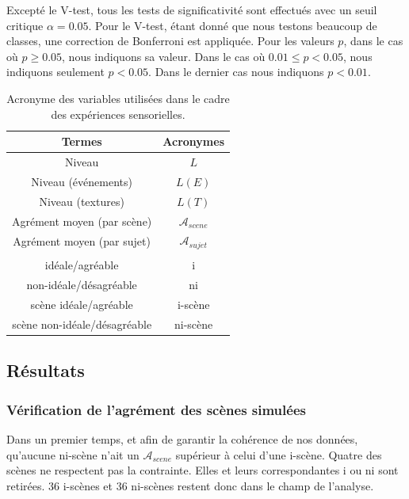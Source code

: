 \documentclass[twoside,twocolumn]{article}
\begin{document}
Excepté le V-test, tous les tests de significativité sont effectués avec un seuil critique $\alpha=0.05$. Pour le V-test, étant donné que nous testons beaucoup de classes, une correction de Bonferroni est appliquée. Pour les valeurs $p$, dans le cas où $p\geq0.05$, nous indiquons sa valeur. Dans le cas où $0.01\leq p<0.05$, nous indiquons seulement $p<0.05$. Dans le dernier cas nous indiquons $p<0.01$.

\begin{table}[t]
\centering
\begin{tabular}{c c} 
Termes                         & Acronymes              \\   
\hline                    
Niveau                         & $L$                    \\ 
Niveau (événements)            & $L(E)$                 \\
Niveau (textures)              & $L(T)$                 \\ 
Agrément moyen (par scène)     & $\mathcal{A}_{scene}$  \\
Agrément moyen (par sujet)     & $\mathcal{A}_{sujet}$  \\
                               &                        \\
idéale/agréable                & i                      \\
non-idéale/désagréable         & ni                     \\
scène idéale/agréable          & i-scène                \\
scène non-idéale/désagréable   & ni-scène               \\
\hline
\end{tabular}
\vspace{0.5mm}
\caption{Acronyme des variables utilisées dans le cadre des expériences sensorielles.}
\label{tab:acronyme}
\end{table}

\subsection{Résultats}

\subsubsection*{Vérification de l'agrément des scènes simulées}

Dans un premier temps, et afin de garantir la cohérence de nos données,   qu'aucune ni-scène n'ait un $\mathcal{A}_{scene}$ supérieur à celui d'une i-scène. Quatre des scènes ne respectent pas la contrainte. Elles et leurs correspondantes i ou ni sont retirées. 36 i-scènes et 36 ni-scènes restent donc dans le champ de l'analyse.
\end{document}
